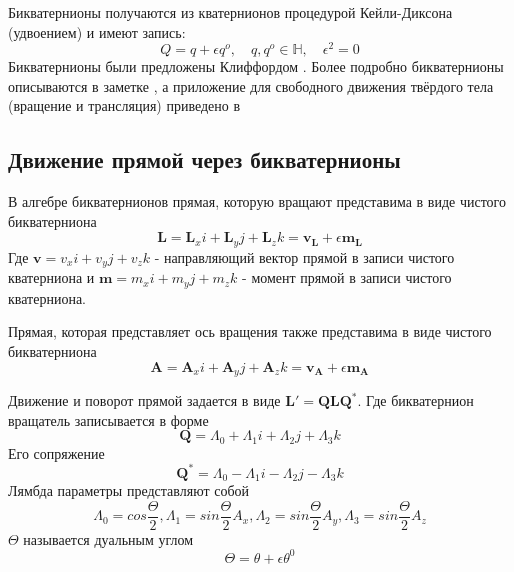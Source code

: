   Бикватернионы получаются из кватернионов процедурой Кейли-Диксона (удвоением) и имеют запись:
  \begin{equation*}
    Q = q + \epsilon q^o, \quad q,q^o \in \mathbb{H}, \quad \epsilon^2=0
  \end{equation*}
  Бикватернионы были предложены Клиффордом \autocite{cliffordPreliminarySketchBiquaternions1871}. Более подробно бикватернионы описываются в заметке \autocite{jiaDualQuaternions2018},
  а приложение для свободного движения твёрдого тела (вращение и трансляция) приведено в \autocite[Гл. N]{chelnokov2006кватернионные}

  \subsection{Движение прямой через бикватернионы}

  В алгебре бикватернионов прямая, которую вращают представима в виде чистого бикватерниона
  \begin{equation*}
    \mathbf{L} = \mathbf{L}_x i + \mathbf{L}_y j + \mathbf{L}_z k = \mathbf{v}_\mathbf{L} + \epsilon \mathbf{m}_\mathbf{L}
  \end{equation*}
  Где $\mathbf{v} = v_x i + v_y j + v_z k$ - направляющий вектор прямой в записи чистого кватерниона и $\mathbf{m} = m_x i + m_y j + m_z k$ - момент прямой в записи чистого кватерниона.
  
  Прямая, которая представляет ось вращения также представима в виде чистого бикватерниона
  \begin{equation*}
    \mathbf{A} = \mathbf{A}_x i + \mathbf{A}_y j + \mathbf{A}_z k = \mathbf{v}_\mathbf{A} + \epsilon \mathbf{m}_\mathbf{A}
  \end{equation*}

  Движение и поворот прямой задается в виде $\mathbf{L}' = \mathbf{QLQ^*}$. Где бикватернион вращатель записывается в форме
  \begin{equation*}
    \mathbf{Q} = \Lambda_0 + \Lambda_1 i + \Lambda_2 j + \Lambda_3 k
  \end{equation*}
  Его сопряжение 
  \begin{equation*}
    \mathbf{Q}^* = \Lambda_0 - \Lambda_1 i - \Lambda_2 j - \Lambda_3 k
  \end{equation*}
  Лямбда параметры представляют собой
  \begin{equation*}
    \Lambda_0 = cos{\frac{\Theta}{2}}, \Lambda_1 = sin{\frac{\Theta}{2}}A_x, \Lambda_2 = sin{\frac{\Theta}{2}}A_y, \Lambda_3 = sin{\frac{\Theta}{2}}A_z
  \end{equation*}
  $\Theta$ называется дуальным углом  
  \begin{equation*}
    \Theta  = \theta + \epsilon \theta^0
  \end{equation*}


